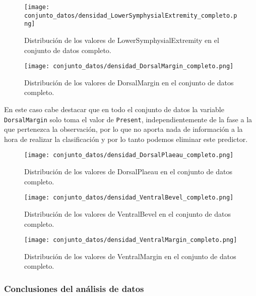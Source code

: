 \begin{figure}[H]
	\centering
	\texttt{[image: conjunto\_datos/densidad\_LowerSymphysialExtremity\_completo.png]}
	\caption{Distribución de los valores de LowerSymphysialExtremity en el conjunto de datos completo.}
	\label{fig:densidad_LowerSymphysialExtremity_completo}
\end{figure}


\begin{figure}[H]
	\centering
	\texttt{[image: conjunto\_datos/densidad\_DorsalMargin\_completo.png]}
	\caption{Distribución de los valores de DorsalMargin en el conjunto de datos completo.}
	\label{fig:densidad_DorsalMargin_completo}
\end{figure}

En este caso cabe destacar que en todo el conjunto de datos la variable \texttt{DorsalMargin} solo toma el valor de \texttt{Present}, independientemente de la fase a la que pertenezca la observación, por lo que no aporta nada de información a la hora de realizar la clasificación y por lo tanto podemos eliminar este predictor.

\begin{figure}[H]
	\centering
	\texttt{[image: conjunto\_datos/densidad\_DorsalPlaeau\_completo.png]}
	\caption{Distribución de los valores de DorsalPlaeau en el conjunto de datos completo.}
	\label{fig:densidad_DorsalPlaeau_completo}
\end{figure}


\begin{figure}[H]
	\centering
	\texttt{[image: conjunto\_datos/densidad\_VentralBevel\_completo.png]}
	\caption{Distribución de los valores de VentralBevel en el conjunto de datos completo.}
	\label{fig:densidad_VentralBevel_completo}
\end{figure}

\begin{figure}[H]
	\centering
	\texttt{[image: conjunto\_datos/densidad\_VentralMargin\_completo.png]}
	\caption{Distribución de los valores de VentralMargin en el conjunto de datos completo.}
	\label{fig:densidad_VentralMargin_completo}
\end{figure}



\subsubsection{Conclusiones del análisis de datos}

